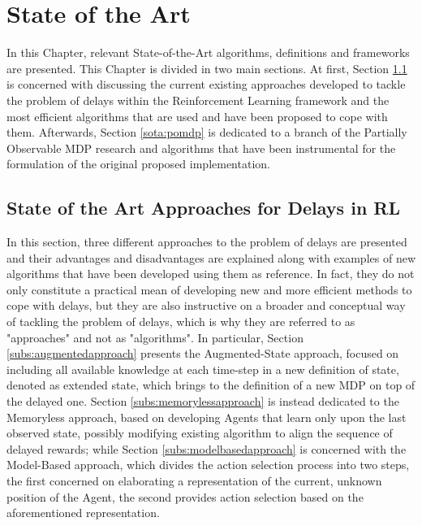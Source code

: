  \chapter{State of the Art}
    \label{chp:sota}
    In this Chapter, relevant State-of-the-Art algorithms, definitions and frameworks are presented. This Chapter is divided in two main sections. At first, Section \ref{sota:delay_approaches} is concerned with discussing the current existing approaches developed to tackle the problem of delays within the Reinforcement Learning framework and the most efficient algorithms that are used and have been proposed to cope with them. Afterwards, Section \ref{sota:pomdp} is dedicated to a branch of the Partially Observable MDP research and algorithms that have been instrumental for the formulation of the original proposed implementation.
    
    \section{State of the Art Approaches for Delays in RL}
        \label{sota:delay_approaches}
        In this section, three different approaches to the problem of delays are presented and their advantages and disadvantages are explained along with examples of new algorithms that have been developed using them as reference. In fact, they do not only constitute a practical mean of developing new and more efficient methods to cope with delays, but they are also instructive on a broader and conceptual way of tackling the problem of delays, which is why they are referred to as "approaches" and not as "algorithms". \newline
        In particular, Section \ref{subs:augmentedapproach} presents the Augmented-State approach, focused on including all available knowledge at each time-step in a new definition of state, denoted as extended state, which brings to the definition of a new MDP on top of the delayed one. Section \ref{subs:memorylessapproach} is instead dedicated to the Memoryless approach, based on developing Agents that learn only upon the last observed state, possibly modifying existing algorithm to align the sequence of delayed rewards; while Section \ref{subs:modelbasedapproach} is concerned with the Model-Based approach, which divides the action selection process into two steps, the first concerned on elaborating a representation of the current, unknown position of the Agent, the second provides action selection based on the aforementioned representation.
        
